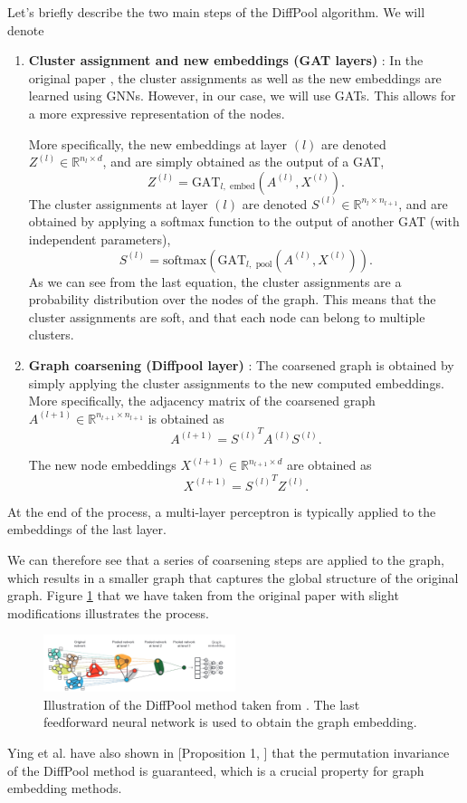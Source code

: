 \documentclass[switch, 11pt]{article}
\newcommand{\R}{\mathbb{R}}
\begin{document}
\begin{multicols}{2}
    Let's briefly describe the two main steps of the DiffPool algorithm. We will denote
    \begin{enumerate}
        \item \textbf{Cluster assignment and new embeddings (GAT layers)} : In the original paper \cite{ying-2018}, the cluster assignments as well as the new embeddings are learned using GNNs. However, in our case, we will use GATs. This allows for a more expressive representation of the nodes.

              More specifically, the new embeddings at layer $(l)$ are denoted $Z^{(l)}\in\R^{n_l\times d}$, and are simply obtained as the output of a GAT,
              $$Z^{(l)} = \text{GAT}_{l, \text{ embed}}\left(A^{(l)},X^{(l)}\right).$$
              \noindent The cluster assignments at layer $(l)$ are denoted $S^{(l)}\in\R^{n_l\times n_{l+1}}$, and are obtained by applying a softmax function to the output of another GAT (with independent parameters),
              $$S^{(l)} = \text{softmax}\left(\text{GAT}_{l, \text{ pool}}\left(A^{(l)},X^{(l)}\right)\right).$$
              \noindent As we can see from the last equation, the cluster assignments are a probability distribution over the nodes of the graph. This means that the cluster assignments are soft, and that each node can belong to multiple clusters.
        \item \textbf{Graph coarsening (Diffpool layer)} : The coarsened graph is obtained by simply applying the cluster assignments to the new computed embeddings. More specifically, the adjacency matrix of the coarsened graph $A^{(l+1)} \in \R^{n_{l+1}\times n_{l+1}}$ is obtained as
              $$A^{(l+1)} = {S^{(l)}}^TA^{(l)}S^{(l)}.$$

              The new node embeddings $X^{(l+1)}\in\R^{n_{l+1}\times d}$ are obtained as
              $$X^{(l+1)} = {S^{(l)}}^T Z^{(l)}.$$
    \end{enumerate}
    At the end of the process, a multi-layer perceptron is typically applied to the embeddings of the last layer.

    We can therefore see that a series of coarsening steps are applied to the graph, which results in a smaller graph that captures the global structure of the original graph. Figure \ref{fig:diffpool} that we have taken from the original paper \cite{ying-2018} with slight modifications illustrates the process.

    \begin{figure}[H]
        \centering
        \includegraphics[width=0.5\textwidth]{figures/diffpool.jpg}
        \caption{Illustration of the DiffPool method taken from \cite{ying-2018}. The last feedforward neural network is used to obtain the graph embedding.}
        \label{fig:diffpool}
    \end{figure}
    Ying et al. have also shown in [Proposition 1, \cite{ying-2018}] that the permutation invariance of the DiffPool method is guaranteed, which is a crucial property for graph embedding methods.

\end{multicols}
\end{document}
